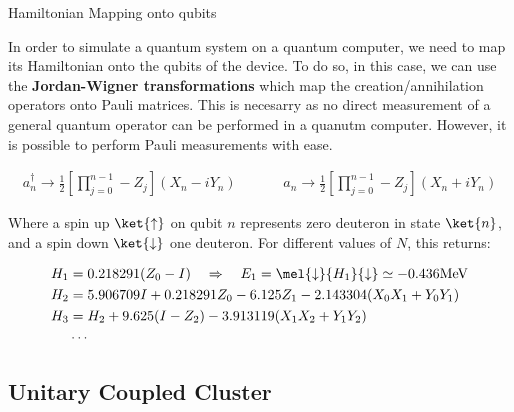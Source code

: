 \documentclass[9pt, handout, aspectratio=169]{beamer}		%
\begin{document}
	\begin{frame}{Hamiltonian Mapping onto qubits}

		In order to simulate a quantum system on a quantum computer, we need to map its Hamiltonian onto the qubits of the device. To do so, in this case, we can use the \textbf{Jordan-Wigner transformations} which map the creation/annihilation operators onto Pauli matrices. This is necesarry as no direct measurement of a general quantum operator can be performed in a quanutm computer. However, it is possible to perform Pauli measurements with ease.

		\begin{align*}
			a^{\dagger}_{n} \rightarrow \frac{1}{2} \left[ \prod^{n-1}_{j=0} -Z_j \right] (X_n - i Y_n)
			\hspace{40pt}
			a_{n} \rightarrow \frac{1}{2} \left[ \prod^{n-1}_{j=0} -Z_j \right] (X_n + i Y_n)
		\end{align*}

		Where a spin up $\ket{\uparrow}$ on qubit $n$ represents zero deuteron in state $\ket{n}$, and a spin down $\ket{\downarrow}$ one deuteron. For different values of $N$, this returns:

		\begin{align*}
			H_1 &= 0.218291(Z_0 - I) \quad \Rightarrow \quad E_1 = \mel{\downarrow}{H_1}{\downarrow} \simeq -0.436 \text{MeV} \\
			H_2 &= 5.906709 I + 0.218291 Z_0 - 6.125 Z_1 - 2.143304(X_0 X_1 + Y_0 Y_1) \\
			H_3 &= H_2 + 9.625(I-Z_2) - 3.913119(X_1 X_2 + Y_1 Y_2) \\
			&\cdots
		\end{align*}

		\vspace{-20pt}

	\end{frame}


	\subsection{Unitary Coupled Cluster}
\end{document}
